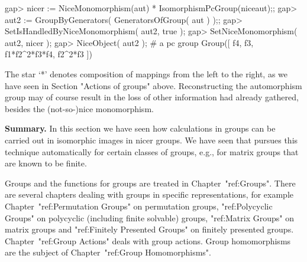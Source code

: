 \beginexample
gap> nicer := NiceMonomorphism(aut) * IsomorphismPcGroup(niceaut);;
gap> aut2 := GroupByGenerators( GeneratorsOfGroup( aut ) );;
gap> SetIsHandledByNiceMonomorphism( aut2, true );
gap> SetNiceMonomorphism( aut2, nicer );
gap> NiceObject( aut2 );  # a pc group
Group([ f4, f3, f1*f2^2*f3*f4, f2^2*f3 ])
\endexample

The star `*' denotes composition of mappings  from the left to the right,
as we  have  seen in  Section "Actions of  groups" above.
Reconstructing the
automorphism group may of course result in the  loss of other information
{\GAP} had already gathered, besides the (not-so-)nice monomorphism.

%

{\bf Summary.}  In this section we have  seen  how calculations in groups
can be carried  out in isomorphic  images in  nicer groups. We  have seen
that {\GAP}  pursues this technique  automatically for certain classes of
groups, e.g., for matrix groups that are known to be finite.


Groups and the functions for groups are treated in Chapter~"ref:Groups".
There are several chapters dealing with groups in specific representations,
for example Chapter~"ref:Permutation Groups" on permutation groups,
"ref:Polycyclic Groups" on polycyclic (including finite solvable) groups,
"ref:Matrix Groups" on matrix groups and "ref:Finitely Presented Groups" on
finitely presented groups.
Chapter~"ref:Group Actions" deals with group actions. Group
homomorphisms are the subject of Chapter~"ref:Group Homomorphisms".


